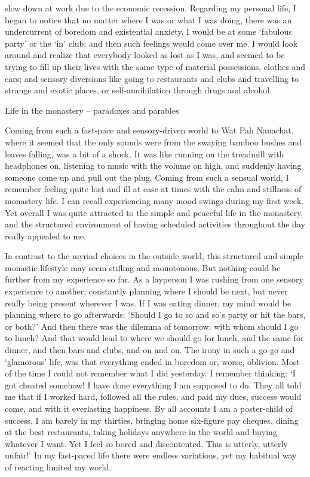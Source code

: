 slow down at work due to the economic recession. Regarding my personal
life, I began to notice that no matter where I was or what I was doing, 
there was an undercurrent of boredom and existential anxiety. I would be
at some `fabulous party' or the `in' club; and then such feelings would
come over me. I would look around and realize that everybody looked as
lost as I was, and seemed to be trying to fill up their lives with the
same type of material possessions, clothes and cars; and sensory
diversions like going to restaurants and clubs and travelling to strange
and exotic places, or self-annihilation through drugs and alcohol. 

Life in the monastery -- paradoxes and parables

Coming from such a fast-pace and sensory-driven world to Wat Pah
Nanachat, where it seemed that the only sounds were from the swaying
bamboo bushes and leaves falling, was a bit of a shock. It was like
running on the treadmill with headphones on, listening to music with the
volume on high, and suddenly having someone come up and pull out the
plug. Coming from such a sensual world, I remember feeling quite lost
and ill at ease at times with the calm and stillness of monastery life. 
I can recall experiencing many mood swings during my first week. Yet
overall I was quite attracted to the simple and peaceful life in the
monastery, and the structured environment of having scheduled activities
throughout the day really appealed to me. 

In contrast to the myriad choices in the outside world, this structured
and simple monastic lifestyle may seem stifling and monotonous. But
nothing could be further from my experience so far. As a layperson I was
rushing from one sensory experience to another, constantly planning
where I should be next, but never really being present wherever I was. 
If I was eating dinner, my mind would be planning where to go
afterwards: `Should I go to so and so's party or hit the bars, or both?'
And then there was the dilemma of tomorrow: with whom should I go to
lunch? And that would lead to where we should go for lunch, and the same
for dinner, and then bars and clubs, and on and on. The irony in such a
go-go and `glamorous' life, was that everything ended in boredom or, 
worse, oblivion. Most of the time I could not remember what I did
yesterday. I remember thinking: `I got cheated somehow! I have done
everything I am supposed to do. They all told me that if I worked hard, 
followed all the rules, and paid my dues, success would come, and with
it everlasting happiness. By all accounts I am a poster-child of
success. I am barely in my thirties, bringing home six-figure pay
cheques, dining at the best restaurants, taking holidays anywhere in the
world and buying whatever I want. Yet I feel so bored and discontented. 
This is utterly, utterly unfair!' In my fast-paced life there were
endless variations, yet my habitual way of reacting limited my world. 

